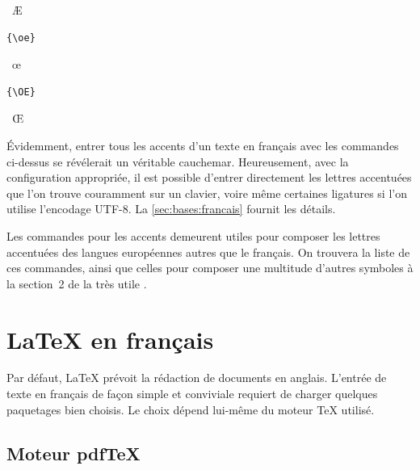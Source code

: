 \begin{demo}
\begin{minipage}{0.2\linewidth}
\begin{texample}
      \producing\ \AE
    \end{texample}
  \end{minipage}
  \hfill
  \begin{minipage}{0.2\linewidth}
    \begin{texample}
\begin{lstlisting}
{\oe}
\end{lstlisting}
      \producing\ \oe
    \end{texample}
  \end{minipage}
  \hfill
  \begin{minipage}{0.2\linewidth}
    \begin{texample}
\begin{lstlisting}
{\OE}
\end{lstlisting}
      \producing\ \OE
    \end{texample}
  \end{minipage}
\end{demo}

Évidemment, entrer tous les accents d'un texte en français avec les
commandes ci-dessus se révélerait un véritable cauchemar.
Heureusement, avec la configuration appropriée, il est possible
d'entrer directement les lettres accentuées que l'on trouve couramment
sur un clavier, voire même certaines ligatures si l'on utilise
l'encodage UTF-8. La \autoref{sec:bases:francais} fournit les détails.

Les commandes pour les accents demeurent utiles pour composer les
lettres accentuées des langues européennes autres que le français. On
trouvera la liste de ces commandes, ainsi que celles pour composer une
multitude d'autres symboles à la section~2 de la très utile %
\citep{comprehensive}.


\section{{\LaTeX} en français}
\label{sec:bases:francais}

Par défaut, LaTeX prévoit la rédaction de documents en anglais.
L'entrée de texte en français de façon simple et conviviale requiert
de charger quelques paquetages bien choisis. Le choix dépend lui-même
du moteur {\TeX} utilisé.

\subsection{Moteur pdf\TeX}
\label{sec:bases:francais:pdftex}


